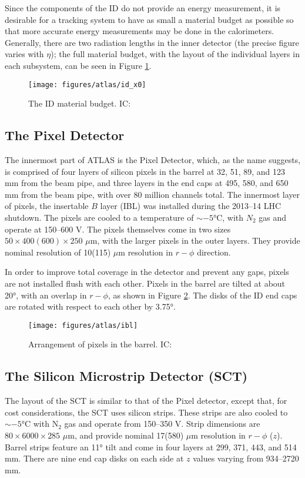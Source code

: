 Since the components of the ID do not provide an energy measurement, it is desirable for a tracking system to have as small a material budget as possible so that more accurate energy measurements may be done in the calorimeters.  Generally, there are two radiation lengths in the inner detector (the precise figure varies with $\eta$); the full material budget, with the layout of the individual layers in each subsystem, can be seen in Figure \ref{fig:idmb}.  

\begin{figure}[!htbp]\captionsetup{justification=centering}
  \centering
  \texttt{[image: figures/atlas/id\_x0]}
  \caption{The ID material budget. IC: \cite{idmaterial}}
  \label{fig:idmb}
\end{figure}

\subsection{The Pixel Detector}
The innermost part of ATLAS is the Pixel Detector, which, as the name suggests, is comprised of four layers of silicon pixels in the barrel at 32, 51, 89, and 123 mm from the beam pipe, and three layers in the end caps at 495, 580, and 650 mm from the beam pipe, with over 80 million channels total.  The innermost layer of pixels, the insertable $B$ layer (IBL) was installed during the 2013--14 LHC shutdown.  The pixels are cooled to a temperature of $\sim-\ang{5}$C, with $N_2$ gas and operate at 150--600 V.  The pixels themselves come in two sizes $50\times400(600)\times250$ $\mu$m, with the larger pixels in the outer layers.  They provide nominal resolution of 10(115) $\mu$m resolution in $r-\phi$ direction.

In order to improve total coverage in the detector and prevent any gaps, pixels are not installed flush with each other.  Pixels in the barrel are tilted at about \ang{20}, with an overlap in $r-\phi$, as shown in Figure \ref{fig:pix}.  The disks of the ID end caps are rotated with respect to each other by \ang{3.75}.

\begin{figure}[!htbp]\captionsetup{justification=centering}
  \centering
  \texttt{[image: figures/atlas/ibl]}
  \caption{Arrangement of pixels in the barrel. IC: \cite{ibltdr}}
  \label{fig:pix}
\end{figure}

\subsection{The Silicon Microstrip Detector (SCT)}
The layout of the SCT is similar to that of the Pixel detector, except that, for cost considerations, the SCT uses silicon strips.  These strips are also cooled to $\sim-\ang{5}$C with N$_2$ gas and operate from 150--350 V.  Strip dimensions are $80\times 6 000\times285$ $\mu$m, and provide nominal  17(580) $\mu$m resolution in $r-\phi$ ($z$).  Barrel strips feature an \ang{11} tilt and come in four layers at 299, 371, 443, and 514 mm.  There are nine  end cap disks on each side at $z$ values varying from 934--2720 mm.

